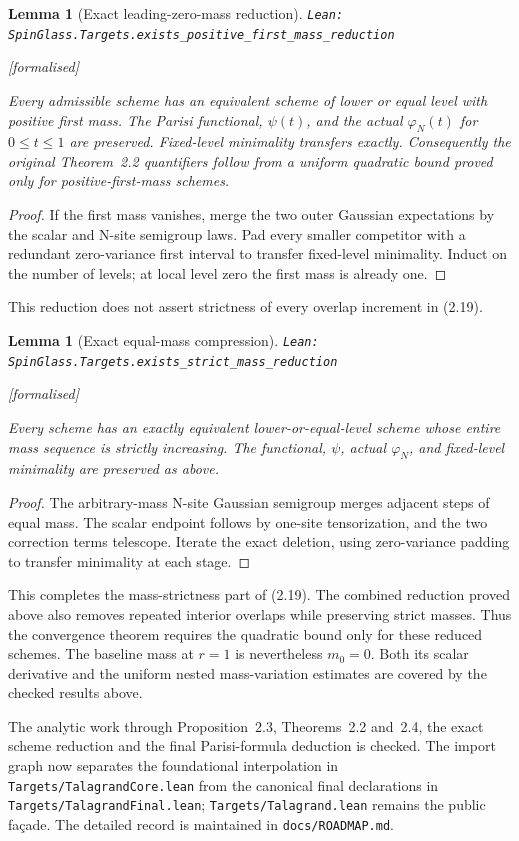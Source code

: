 \documentclass[11pt]{article}
\providecommand{\lean}[1]{\leavevmode\par\nopagebreak
  {\noindent\normalfont\footnotesize\raggedright\texttt{Lean: #1}\par}\nopagebreak}
\providecommand{\leanok}{\par\nopagebreak
  {\noindent\normalfont\footnotesize\textcolor{green!50!black}{[formalised]}\par}\nopagebreak}
\newtheorem{lemma}[theorem]{Lemma}
\begin{document}
\begin{lemma}[Exact leading-zero-mass reduction]
\lean{SpinGlass.Targets.exists\_positive\_first\_mass\_reduction}\leanok
Every admissible scheme has an equivalent scheme of lower or equal level with
positive first mass. The Parisi functional, $\psi(t)$, and the actual $\varphi_N(t)$
for $0\le t\le1$ are preserved. Fixed-level minimality transfers exactly.
Consequently the original Theorem~2.2 quantifiers follow from a uniform quadratic
bound proved only for positive-first-mass schemes.
\end{lemma}
\begin{proof}
If the first mass vanishes, merge the two outer Gaussian expectations by the
scalar and N-site semigroup laws. Pad every smaller competitor with a redundant
zero-variance first interval to transfer fixed-level minimality. Induct on the
number of levels; at local level zero the first mass is already one.
\end{proof}
This reduction does not assert strictness of every overlap increment in (2.19).

\begin{lemma}[Exact equal-mass compression]
\lean{SpinGlass.Targets.exists\_strict\_mass\_reduction}\leanok
Every scheme has an exactly equivalent lower-or-equal-level scheme whose
entire mass sequence is strictly increasing. The functional, $\psi$, actual
$\varphi_N$, and fixed-level minimality are preserved as above.
\end{lemma}
\begin{proof}
The arbitrary-mass N-site Gaussian semigroup merges adjacent steps of equal
mass. The scalar endpoint follows by one-site tensorization, and the two
correction terms telescope. Iterate the exact deletion, using zero-variance
padding to transfer minimality at each stage.
\end{proof}
This completes the mass-strictness part of (2.19). The combined reduction
proved above also removes repeated interior overlaps while preserving strict
masses. Thus the convergence theorem requires the quadratic bound only for
these reduced schemes. The baseline mass at $r=1$ is
nevertheless $m_0=0$. Both its scalar derivative and the uniform nested
mass-variation estimates are covered by the checked results above.

The analytic work through Proposition~2.3, Theorems~2.2 and~2.4, the exact scheme
reduction and the final Parisi-formula deduction is checked. The import graph now
separates the foundational interpolation in \texttt{Targets/TalagrandCore.lean}
from the canonical final declarations in \texttt{Targets/TalagrandFinal.lean};
\texttt{Targets/Talagrand.lean} remains the public façade. The detailed record is
maintained in \texttt{docs/ROADMAP.md}.
\end{document}
